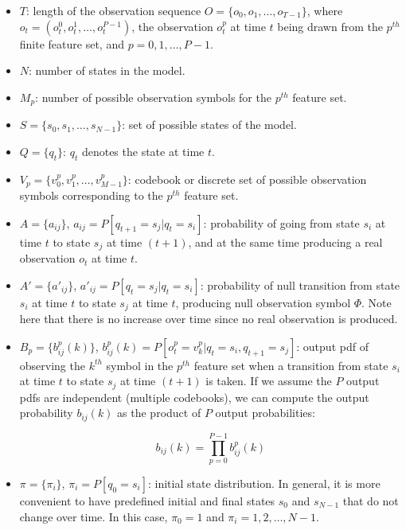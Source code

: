 \documentclass{article}[14pt, oneside, a4paper, times]
\begin{document}
\begin{itemize}

    \item $T$: length of the observation sequence $O = \{ o_0, o_1, \ldots, o_{T-1} \}$,
        where $o_t = (o_t^0, o_t^1, \ldots, o_t^{P-1})$, the observation
        $o_t^p$ at time $t$ being drawn from the $p^{th}$ finite feature set,
        and $p = 0,1, \ldots, P-1$.

    \item $N$: number of states in the model.

    \item $M_p$: number of possible observation symbols for the $p^{th}$ feature set.

    \item $S = \{ s_0, s_1, \ldots, s_{N-1} \}$: set of possible states of the model.

    \item $Q = \{ q_t \}$: $q_t$ denotes the state at time $t$.

    \item $V_p = \{ v_0^p, v_1^p, \ldots, v_{M-1}^p \}$: codebook  or discrete set
        of possible observation symbols corresponding to the $p^{th}$ feature set.

    \item $A = \{ a_{ij} \}$, $a_{ij} = P[ q_{t+1} = s_j | q_t = s_i ]$:
        probability of going from state $s_i$ at time $t$ to state $s_j$ at time
        $(t+1)$, and at the same time producing a real observation $o_t$ at time $t$.

    \item $A' = \{ a'_{ij} \}$, $a'_{ij} = P[ q_t = s_j | q_t = s_i ]$:
        probability of null transition from state $s_i$ at time $t$ to state $s_j$ at time $t$,
        producing null observation symbol $\Phi$. Note here that there is no
        increase over time since no real observation is produced.

    \item $B_p = \{ b_{ij}^p(k) \}$, $b_{ij}^p(k) = P[ o_t^p = v_k^p | q_t = s_i, q_{t+1} = s_j ]$:
        output pdf of observing the $k^{th}$ symbol in the $p^{th}$ feature set when
        a transition from state $s_i$ at time $t$ to state $s_j$ at time $(t+1)$ is taken.
        If we assume the $P$ output pdfs are independent (multiple codebooks),
        we can compute the output probability $b_{ij}(k)$ as the product of $P$
        output probabilities:

\begin{equation}
    b_{ij}(k) = \prod_{p=0}^{P-1} b_{ij}^p(k)
    \label{EQ:b}
\end{equation}

    \item $\pi= \{ \pi_i \}$, $\pi_i = P[q_0 = s_i]$: initial state distribution.
        In general, it is more convenient to have predefined initial and final
        states $s_0$ and $s_{N-1}$ that do not change over time. In this case, $\pi_0 = 1$ and $\pi_i
        = 1, 2, \ldots, N-1$.

\end{itemize}
\end{document}
